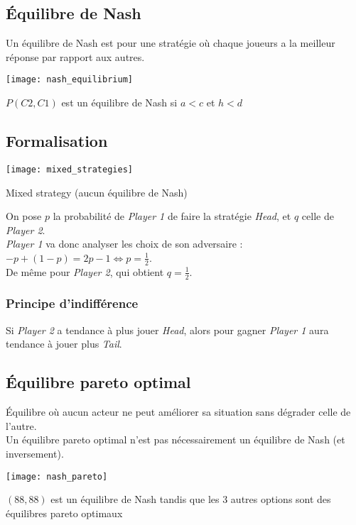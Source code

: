 \subsection{Équilibre de Nash}

Un équilibre de Nash est pour une stratégie où chaque joueurs a la meilleur réponse par rapport aux autres.

\begin{table}[H]
    \centering
    \texttt{[image: nash\_equilibrium]}
    \caption{$P(C2, C1)$ est un équilibre de Nash si $a < c$ et $h < d$}
\end{table}

\subsection{Formalisation}

\begin{table}[H]
    \centering
    \texttt{[image: mixed\_strategies]}
    \caption{Mixed strategy (aucun équilibre de Nash)}
\end{table}

On pose $p$ la probabilité de \textit{Player 1} de faire la stratégie \textit{Head}, et $q$ celle de \textit{Player 2}.\\
\textit{Player 1} va donc analyser les choix de son adversaire : $-p + (1-p) = 2p - 1 \Leftrightarrow p = \frac{1}{2}$.\\
De même pour \textit{Player 2}, qui obtient $q = \frac{1}{2}$.

\subsubsection{Principe d'indifférence}

Si \textit{Player 2} a tendance à plus jouer \textit{Head}, alors pour gagner \textit{Player 1} aura tendance à jouer plus \textit{Tail}.

\subsection{Équilibre pareto optimal}

Équilibre où aucun acteur ne peut améliorer sa situation sans dégrader celle de l'autre.\\
Un équilibre pareto optimal n'est pas nécessairement un équilibre de Nash (et inversement).

\begin{table}[H]
    \centering
    \texttt{[image: nash\_pareto]}
    \caption{$(88, 88)$ est un équilibre de Nash tandis que les 3 autres options sont des équilibres pareto optimaux}
\end{table}

